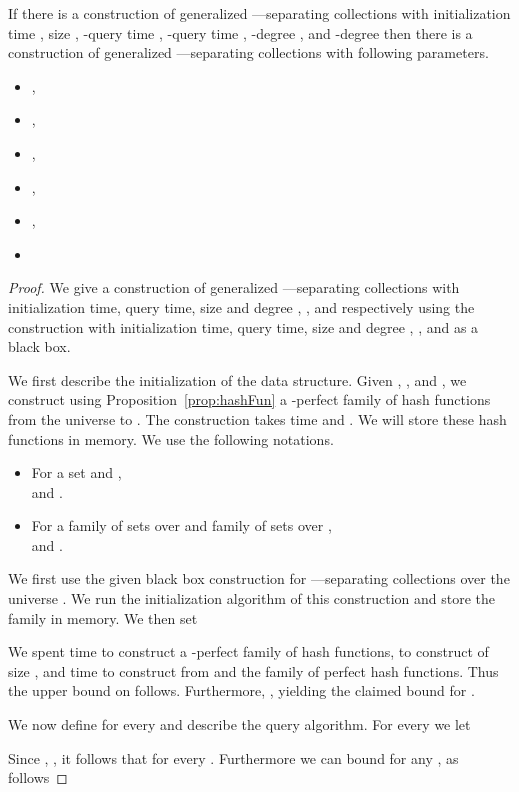 \begin{lemma}\label{lem:twinreduceUniverse} If there is a construction of generalized ---separating collections  with initialization time , size , 
-query time , -query time , 
-degree , and -degree   
then there is a construction of generalized ---separating collections 
with following parameters.
\begin{itemize} \item 
,
\item 
,
\item 
, 
\item 
,
\item 
,
\item 

\end{itemize}
\end{lemma}
\begin{proof}
We give a construction of generalized ---separating collections with initialization time, query time, size and degree , ,  and  respectively using the 
construction with initialization time, query time, size and degree , ,  and  as a black box. 
 
We first describe the initialization of the data structure. Given , , and , we construct using Proposition~\ref{prop:hashFun} a -perfect family  
of hash functions from the universe  to . The construction takes time  and . 
We will store these hash functions in memory. We use the following notations.
\begin{itemize}
 \item For a set  and ,  \\  and . 
 \item For a family  of sets over  and family  of sets over ,\\  and .
\end{itemize}


 We first use the given black box construction for ---separating collections  over the universe . 
We run the initialization algorithm of this construction and store the family  in memory. We then set


 We spent  time to construct a -perfect family of hash functions,   to construct  of size , 
and  time to construct  from  and the family of perfect hash functions. 
Thus the upper bound on  follows. Furthermore,  , yielding the claimed bound for .
 
 We now define  for every  and describe the query algorithm. For every  we let

Since , , it follows that  for every . Furthermore we can bound  for any , 
as follows 


\end{proof}
